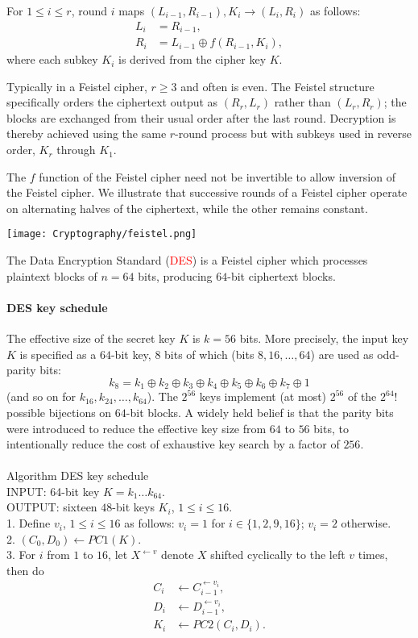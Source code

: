 \documentclass[a4paper, 11pt, openany]{book}
\numberwithin{equation}{section}
\theoremstyle{plain}
\theoremstyle{definition}
\newcommand{\Important}[1]{\textcolor{red}{#1}}
\begin{document}
For $1 \le i \le r$, round $i$ maps $(L_{i-1}, R_{i-1}), K_i \to (L_i,R_i)$ as follows: 
\begin{align*}
    L_i &= R_{i-1},\\
    R_i &= L_{i-1} \oplus f(R_{i-1}, K_i),
\end{align*}
where each subkey $K_i$ is derived from the cipher key $K$.


Typically in a Feistel cipher, $r \ge 3$ and often is even. The Feistel structure specifically
orders the ciphertext output as $(R_r, L_r)$ rather than $(L_r,R_r)$; the blocks are exchanged
from their usual order after the last round. Decryption is thereby achieved using the same
$r$-round process but with subkeys used in reverse order, $K_r$ through $K_1$.

The $f$ function of the Feistel cipher need not be invertible to allow inversion of
the Feistel cipher. We illustrate that successive rounds of a Feistel cipher operate on alternating halves of the ciphertext, while the other remains constant. 

\begin{center}
    \texttt{[image: Cryptography/feistel.png]}
\end{center}

The Data Encryption Standard (\Important{DES}) is a Feistel cipher which processes plaintext blocks of $n = 64$ bits, producing $64$-bit ciphertext blocks. 

\paragraph{DES key schedule}
The effective size of the secret key $K$ is $k = 56$ bits. More precisely, the input key $K$ is specified as a $64$-bit key, $8$ bits of which (bits $8, 16, \dots, 64$) are used as odd-parity bits:
\[
    k_8 = k_1 \oplus k_2 \oplus k_3 \oplus k_4 \oplus k_5 \oplus k_6 \oplus k_7 \oplus 1
\]
(and so on for $k_{16}, k_{24}, \dots, k_{64}$). The $2^{56}$ keys implement (at most) $2^{56}$ of the $2^{64}!$ possible bijections on $64$-bit blocks. A widely held belief is that the parity bits were introduced to reduce the effective key size from $64$ to $56$ bits, to intentionally reduce the cost of exhaustive key search by a factor of $256$.\\
~\\
Algorithm DES key schedule\\
INPUT: 64-bit key $K = k_1 \dots k_{64}$.\\
OUTPUT: sixteen $48$-bit keys $K_i$, $1 \le i \le 16$.\\
1. Define $v_i$, $1 \le i \le 16$ as follows: $v_i = 1$ for $i \in \{1, 2, 9, 16\}$; $v_i = 2$ otherwise.\\
2. $(C_0,D_0) \gets PC1(K)$. \\
3. For $i$ from $1$ to $16$, let $X^{\gets v}$ denote $X$ shifted cyclically to the left $v$ times, then do
\begin{align*}
    C_i &\gets C_{i-1}^{\gets v_i},\\
    D_i &\gets D_{i-1}^{\gets v_i},\\
    K_i &\gets PC2(C_i,D_i).
\end{align*}
\end{document}
